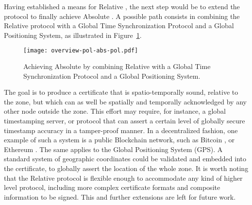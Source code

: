 Having established a means for Relative \pol{}, the next step would be to extend the protocol to finally achieve Absolute \pol{}. A possible path consists in combining the Relative \pol{} protocol with a Global Time Synchronization Protocol and a Global Positioning System, as illustrated in Figure~\ref{fig:proof-of-location-overview-absolute-pol}.

\begin{figure}[h!]
    \begin{center}
    \texttt{[image: overview-pol-abs-pol.pdf]}
    \caption{Achieving Absolute \pol{} by combining Relative \pol{} with a Global Time Synchronization Protocol and a Global Positioning System.}
    \label{fig:proof-of-location-overview-absolute-pol}
    \end{center}
\end{figure}

The goal is to produce a \pol{} certificate that is spatio-temporally sound, relative to the zone, but which can as well be spatially and temporally acknowledged by any other node outside the zone. This effort may require, for instance, a global timestamping server, or protocol that can assert a certain level of globally secure timestamp accuracy in a tamper-proof manner. In a decentralized fashion, one example of such a system is a public Blockchain network, such as Bitcoin \cite{nakamoto2008bitcoin}, or Ethereum \cite{buterin2014next}. The same applies to the Global Positioning System (GPS). A standard system of geographic coordinates could be validated and embedded into the \pol{} certificate, to globally assert the location of the whole zone. It is worth noting that the Relative \pol{} protocol is flexible enough to accommodate any kind of higher level protocol, including more complex certificate formats and composite information to be signed. This and further extensions are left for future work.